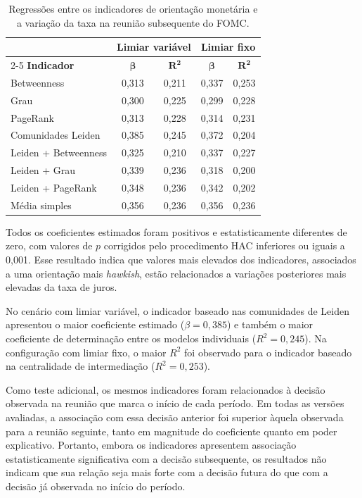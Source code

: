 \begin{table}[H]
\centering
\caption{Regressões entre os indicadores de orientação monetária e a variação da
taxa na reunião subsequente do FOMC.}
\label{tab:regressao-decisao-seguinte}
\begin{tabular}{lcccc}
\hline
& \multicolumn{2}{c}{\textbf{Limiar variável}} &
\multicolumn{2}{c}{\textbf{Limiar fixo}} \\
\cline{2-5}
\textbf{Indicador} &
$\boldsymbol{\beta}$ & $\boldsymbol{R^2}$ &
$\boldsymbol{\beta}$ & $\boldsymbol{R^2}$ \\
\hline
Betweenness            & 0,313 & 0,211 & 0,337 & 0,253 \\
Grau                   & 0,300 & 0,225 & 0,299 & 0,228 \\
PageRank               & 0,313 & 0,228 & 0,314 & 0,231 \\
Comunidades Leiden     & 0,385 & 0,245 & 0,372 & 0,204 \\
Leiden + Betweenness   & 0,325 & 0,210 & 0,337 & 0,227 \\
Leiden + Grau          & 0,339 & 0,236 & 0,318 & 0,200 \\
Leiden + PageRank      & 0,348 & 0,236 & 0,342 & 0,202 \\
Média simples          & 0,356 & 0,236 & 0,356 & 0,236 \\
\hline
\end{tabular}

\medskip
{}
\end{table}

Todos os coeficientes estimados foram positivos e estatisticamente diferentes de
zero, com valores de $p$ corrigidos pelo procedimento HAC inferiores ou iguais a
0,001. Esse resultado indica que valores mais elevados dos indicadores, associados
a uma orientação mais \textit{hawkish}, estão relacionados a variações posteriores
mais elevadas da taxa de juros.

No cenário com limiar variável, o indicador baseado nas comunidades de Leiden
apresentou o maior coeficiente estimado ($\beta = 0,385$) e também o maior
coeficiente de determinação entre os modelos individuais ($R^2 = 0,245$). Na
configuração com limiar fixo, o maior $R^2$ foi observado para o indicador baseado
na centralidade de intermediação ($R^2 = 0,253$).

Como teste adicional, os mesmos indicadores foram relacionados à decisão observada
na reunião que marca o início de cada período. Em todas as versões avaliadas, a
associação com essa decisão anterior foi superior àquela observada para a reunião
seguinte, tanto em magnitude do coeficiente quanto em poder explicativo. Portanto,
embora os indicadores apresentem associação estatisticamente significativa com a
decisão subsequente, os resultados não indicam que sua relação seja mais forte com
a decisão futura do que com a decisão já observada no início do período.

